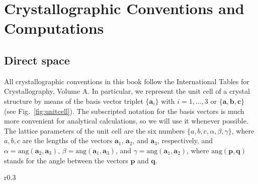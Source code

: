 \section{Crystallographic Conventions and Computations\label{ssec:crystalconventions}}

\subsection{Direct space}
All crystallographic conventions in this book follow the International Tables for Crystallography, Volume A.  In particular, we represent the unit cell of a crystal structure by means of the basis vector triplet $\{\mathbf{a}_i\}$ with $i=1,\ldots,3$ or $\{\mathbf{a}, \mathbf{b},\mathbf{c}\}$ (see Fig.~\ref{fig:unitcell}). The subscripted notation for the basis vectors is much more convenient for analytical calculations, so we will use it whenever possible. The lattice parameters of the unit cell are the six numbers $\{a,b,c,\alpha,\beta,\gamma\}$, where $a, b, c$ are the lengths of the vectors $\mathbf{a}_1$, $\mathbf{a}_2$, and $\mathbf{a}_3$, respectively, and $\alpha=\text{ang}(\mathbf{a}_2,\mathbf{a}_3)$,  $\beta=\text{ang}(\mathbf{a}_1,\mathbf{a}_3)$,  and $\gamma=\text{ang}(\mathbf{a}_1,\mathbf{a}_2)$, where $\text{ang}(\mathbf{p},\mathbf{q})$ stands for the angle between the vectors $\mathbf{p}$ and $\mathbf{q}$.

\begin{wrapfigure}{r}{0.3\textwidth}
  \centering\leavevmode
\caption{\small Illustration of the basis vectors of a crystallographic unit cell.\label{fig:unitcell}}
\end{wrapfigure}

